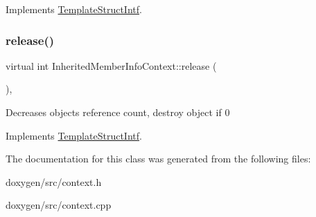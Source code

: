 Implements \mbox{\hyperlink{class_template_struct_intf_a3d610cb81b4adbb531ebed3aa3d09b51}{Template\+Struct\+Intf}}.

\mbox{\label{class_inherited_member_info_context_a285fdfc40bae5fb0a66ad5a38781ee05}} 
\subsubsection{\texorpdfstring{release()}{release()}}
{\footnotesize\ttfamily virtual int Inherited\+Member\+Info\+Context\+::release (\begin{DoxyParamCaption}{ }\end{DoxyParamCaption})\hspace{0.3cm}{\ttfamily [inline]}, {\ttfamily [virtual]}}

Decreases object\textquotesingle{}s reference count, destroy object if 0 

Implements \mbox{\hyperlink{class_template_struct_intf_a3dce7dd29d3f66a8080b40578e8a5045}{Template\+Struct\+Intf}}.



The documentation for this class was generated from the following files\+:\begin{DoxyCompactItemize}
\item 
doxygen/src/context.\+h\item 
doxygen/src/context.\+cpp\end{DoxyCompactItemize}
